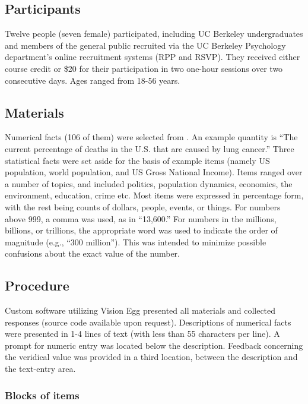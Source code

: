 \subsection{Participants}

Twelve people (seven female) participated, including UC Berkeley undergraduates
and members of the general public recruited via the UC Berkeley Psychology
department's online recruitment systems (RPP and RSVP). They received either
course credit or \$20 for their participation in two one-hour sessions over two
consecutive days. Ages ranged from 18-56 years. 

\subsection{Materials}

Numerical facts (106 of them) were selected from \textcite{ranney_designing_2008}.
An example quantity is ``The current percentage of deaths in the U.S. that are
caused by lung cancer.'' Three statistical facts were set aside for the basis of
example items (namely US population, world population, and US Gross National
Income). Items ranged over a number of topics, and included politics, population
dynamics, economics, the environment, education, crime etc. Most items were
expressed in percentage form, with the rest being counts of dollars, people,
events, or things. For numbers above 999, a comma was used, as in ``13,600.''  For
numbers in the millions, billions, or trillions, the appropriate word was used
to indicate the order of magnitude (e.g., ``300 million'').  This was intended to
minimize possible confusions about the exact value of the number.

\subsection{Procedure}

Custom software utilizing Vision Egg \parencite{straw_vision_2008} presented all materials and
collected responses (source code available upon request). Descriptions of
numerical facts were presented in 1-4 lines of text (with less than 55
characters per line). A prompt for numeric entry was located below the
description. Feedback concerning the veridical value was provided in a third
location, between the description and the text-entry area.

\subsubsection{Blocks of items}

